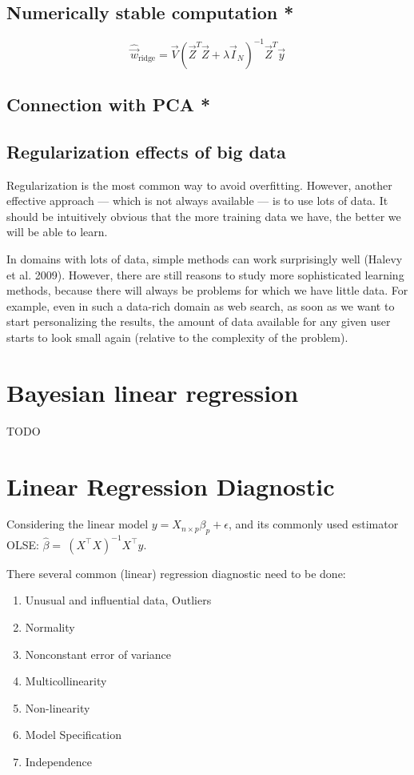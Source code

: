 \subsection{Numerically stable computation *}

\begin{equation}\label{eqn:Ridge-regression-SVD}
\hat{\vec{w}}_{\mathrm{ridge}}=\vec{V}(\vec{Z}^T\vec{Z}+\lambda\vec{I}_N)^{-1}\vec{Z}^T\vec{y}
\end{equation}


\subsection{Connection with PCA *}


\subsection{Regularization effects of big data}
Regularization is the most common way to avoid overfitting. However, another effective approach — which is not always available — is to use lots of data. It should be intuitively obvious that the more training data we have, the better we will be able to learn.

In domains with lots of data, simple methods can work surprisingly well (Halevy et al. 2009). However, there are still reasons to study more sophisticated learning methods, because there will always be problems for which we have little data. For example, even in such a data-rich domain as web search, as soon as we want to start personalizing the results, the amount of data available for any given user starts to look small again (relative to the complexity of the problem).


\section{Bayesian linear regression}
TODO

\section{Linear Regression Diagnostic}

Considering the linear model \(y = X_{n \times p}\beta_{p} + \epsilon\),
and its commonly used estimator OLSE:
\(\hat{\beta} = \ (X^{\top}X)^{- 1}X^{\top}y\).

There several common (linear) regression diagnostic need to be done:

\begin{enumerate}
	\def\labelenumi{\arabic{enumi}.}
	\item
	Unusual and influential data, Outliers
	\item
	Normality
	\item
	Nonconstant error of variance
	\item
	Multicollinearity
	\item
	Non-linearity
	\item
	Model Specification
	\item
	Independence
\end{enumerate}

